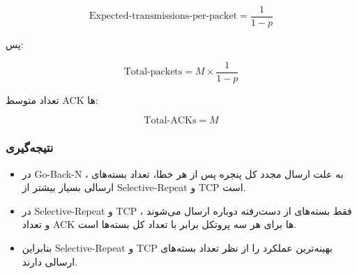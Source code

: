 {\[
\text{Expected-transmissions-per-packet} = \frac{1}{1 - p}
\]

پس:

\[
\text{Total-packets} = M \times \frac{1}{1 - p}
\]

تعداد متوسط ACK ها:

\[
\text{Total-ACKs} = M
\]

\subsubsection*{نتیجه‌گیری}

\begin{itemize}
    \item در Go-Back-N ، به علت ارسال مجدد کل پنجره پس از هر خطا، تعداد بسته‌های ارسالی بسیار بیشتر از Selective-Repeat و TCP است.
    \item در Selective-Repeat و TCP ، فقط بسته‌های از دست‌رفته دوباره ارسال می‌شوند و تعداد ACK ها برای هر سه پروتکل برابر با تعداد کل بسته‌ها است.
    \item بنابراین Selective-Repeat و TCP بهینه‌ترین عملکرد را از نظر تعداد بسته‌های ارسالی دارند.
\end{itemize}
	
}

